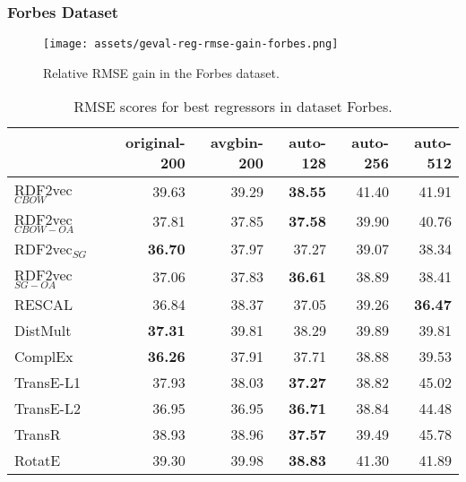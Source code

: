 \documentclass[11pt,titlepage,oneside,openany]{book}
\begin{document}
\newpage

\subsubsection{Forbes Dataset}
\label{subsubsec:geval-results-reg-forbes}


\begin{figure}[H]
    \centering
    \texttt{[image: assets/geval-reg-rmse-gain-forbes.png]}
    \vspace*{-3mm}
    \caption{Relative RMSE gain in the Forbes dataset.}
    \label{fig:geval-reg-rmse-gain-forbes}
\end{figure}


\begin{table}[H]
\centering
\begin{tabular}{lrrrrr}
\toprule
{} &  original-200 &  avgbin-200 &  auto-128 &  auto-256 &  auto-512 \\
\midrule
RDF2vec$_{CBOW}$     &         39.63  &       39.29  &	\textbf{38.55} &     41.40  &     41.91  \\
RDF2vec$_{CBOW-OA}$  &         37.81  &       37.85  &	\textbf{37.58} &     39.90  &     40.76  \\
RDF2vec$_{SG}$       &	\textbf{36.70} &       37.97  &     37.27  &     39.07  &     38.34  \\
RDF2vec$_{SG-OA}$    &         37.06  &       37.83  &	\textbf{36.61} &     38.89  &     38.41  \\
RESCAL               &         36.84  &       38.37  &     37.05  &     39.26  &	\textbf{36.47} \\
DistMult             &	\textbf{37.31} &       39.81  &     38.29  &     39.89  &     39.81  \\
ComplEx              &	\textbf{36.26} &       37.91  &     37.71  &     38.88  &     39.53  \\
TransE-L1            &         37.93  &       38.03  &	\textbf{37.27} &     38.82  &     45.02  \\
TransE-L2            &         36.95  &       36.95  &	\textbf{36.71} &     38.84  &     44.48  \\
TransR               &         38.93  &       38.96  &	\textbf{37.57} &     39.49  &     45.78  \\
RotatE               &         39.30  &       39.98  &	\textbf{38.83} &     41.30  &     41.89  \\
\bottomrule
\end{tabular}
\caption{RMSE scores for best regressors in dataset Forbes.}
\label{tab:geval-reg-rmse-forbes}
\end{table}
\end{document}
